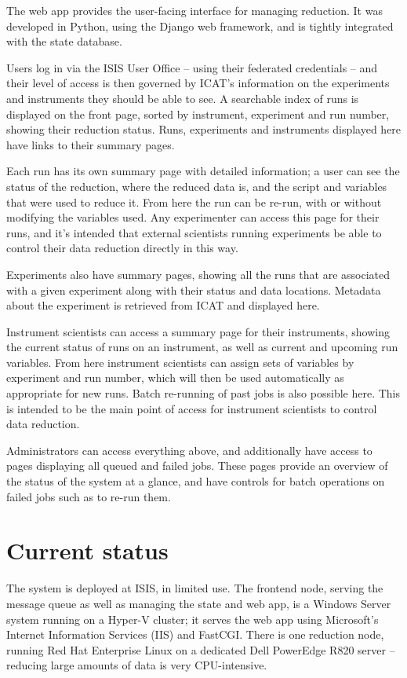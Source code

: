 \documentclass[twocolumn]{article}
\begin{document}
The web app provides the user-facing interface for managing reduction.
It was developed in Python, using the Django web framework, and is
tightly integrated with the state database.

Users log in via the ISIS User Office -- using their federated
credentials -- and their level of access is then governed by ICAT's
information on the experiments and instruments they should be able to
see. A searchable index of runs is displayed on the front page, sorted
by instrument, experiment and run number, showing their reduction
status. Runs, experiments and instruments displayed here have links to
their summary pages.

Each run has its own summary page with detailed information; a user can
see the status of the reduction, where the reduced data is, and the
script and variables that were used to reduce it. From here the run can
be re-run, with or without modifying the variables used. Any
experimenter can access this page for their runs, and it's intended that
external scientists running experiments be able to control their data
reduction directly in this way.

Experiments also have summary pages, showing all the runs that are
associated with a given experiment along with their status and data
locations. Metadata about the experiment is retrieved from ICAT and
displayed here.

Instrument scientists can access a summary page for their instruments,
showing the current status of runs on an instrument, as well as current
and upcoming run variables. From here instrument scientists can assign
sets of variables by experiment and run number, which will then be used
automatically as appropriate for new runs. Batch re-running of past jobs
is also possible here. This is intended to be the main point of access
for instrument scientists to control data reduction.

Administrators can access everything above, and additionally have access
to pages displaying all queued and failed jobs. These pages provide an
overview of the status of the system at a glance, and have controls for
batch operations on failed jobs such as to re-run them.

\section{Current status}\label{current-status}

The system is deployed at ISIS, in limited use. The frontend node,
serving the message queue as well as managing the state and web app, is
a Windows Server system running on a Hyper-V cluster; it serves the web
app using Microsoft's Internet Information Services (IIS) and FastCGI.
There is one reduction node, running Red Hat Enterprise Linux on a
dedicated Dell PowerEdge R820 server -- reducing large amounts of data
is very CPU-intensive.
\end{document}
